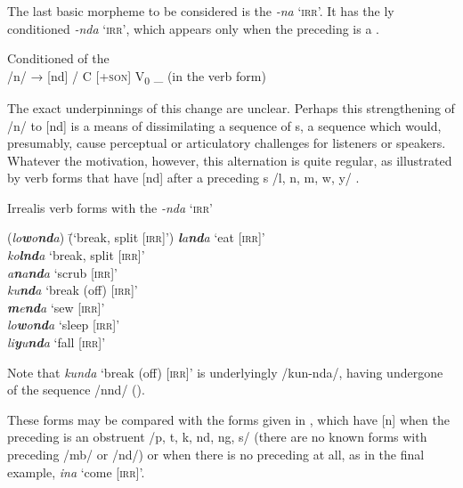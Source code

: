   The last basic  morpheme to be considered is the   \textit{{}-na} ‘\textsc{irr}’. It has the ly conditioned  \textit{{}-nda} ‘\textsc{irr}’, which appears only when the preceding  is a  .

\ea%
    \label{ex:verbs:3}

            Conditioned  of the  \\
    /n/ → [nd] / C [+\textsc{son}] V\textsubscript{0} \_ (in the  verb form)
\z

The exact  underpinnings of this change are unclear. Perhaps this strengthening of /n/ to [nd] is a means of  dissimilating a sequence of s, a sequence which would, presumably, cause perceptual or articulatory challenges for listeners or speakers. Whatever the  motivation, however, this alternation is quite regular, as illustrated by  verb forms that have [nd] after a preceding  s /l, n, m, w, y/ .

\ea%
    \label{ex:verbs:4}
            Irrealis verb forms with the  \textit{-nda} ‘\textsc{irr}’\\
\begin{tabbing}
{(\textit{lo\textbf{w}o\textbf{nd}a})} \= {(‘break, split [\textsc{irr}]’)}\kill
\textit{\textbf{l}a\textbf{nd}a} \> {‘eat [\textsc{irr}]’}\\
\textit{ko\textbf{lnd}a} \> {‘break, split [\textsc{irr}]’}\\
\textit{a\textbf{n}a\textbf{nd}a} \> {‘scrub [\textsc{irr}]’}\\
\textit{ku\textbf{nd}a} \> {‘break (off) [\textsc{irr}]}’\\
\textit{\textbf{m}e\textbf{nd}a} \> {‘sew [\textsc{irr}]’}\\
\textit{lo\textbf{w}o\textbf{nd}a} \> {‘sleep [\textsc{irr}]’}\\
\textit{li\textbf{y}u\textbf{nd}a} \> {‘fall [\textsc{irr}]’}
\end{tabbing}
\z

Note that \textit{kunda} ‘break (off) [\textsc{irr}]’ is underlyingly /kun-nda/, having undergone  of the sequence /nnd/ ().

These forms may be compared with the  forms given in , which have [n] when the preceding  is an obstruent /p, t, k, nd, ng, s/ (there are no known forms with preceding /mb/ or /nd/) or when there is no preceding  at all, as in the final example, \textit{ina} ‘come [\textsc{irr}]’.

